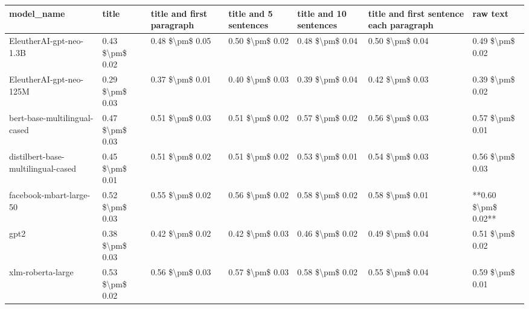 \begin{tabular}{lllllll}
\toprule
                        model\_name &           title & title and first paragraph & title and 5 sentences & title and 10 sentences & title and first sentence each paragraph &            raw text \\
\midrule
           EleutherAI-gpt-neo-1.3B & 0.43 \$\textbackslash pm\$ 0.02 &           0.48 \$\textbackslash pm\$ 0.05 &       0.50 \$\textbackslash pm\$ 0.02 &        0.48 \$\textbackslash pm\$ 0.04 &                         0.50 \$\textbackslash pm\$ 0.04 &     0.49 \$\textbackslash pm\$ 0.02 \\
           EleutherAI-gpt-neo-125M & 0.29 \$\textbackslash pm\$ 0.03 &           0.37 \$\textbackslash pm\$ 0.01 &       0.40 \$\textbackslash pm\$ 0.03 &        0.39 \$\textbackslash pm\$ 0.04 &                         0.42 \$\textbackslash pm\$ 0.03 &     0.39 \$\textbackslash pm\$ 0.02 \\
      bert-base-multilingual-cased & 0.47 \$\textbackslash pm\$ 0.03 &           0.51 \$\textbackslash pm\$ 0.03 &       0.51 \$\textbackslash pm\$ 0.02 &        0.57 \$\textbackslash pm\$ 0.02 &                         0.56 \$\textbackslash pm\$ 0.03 &     0.57 \$\textbackslash pm\$ 0.01 \\
distilbert-base-multilingual-cased & 0.45 \$\textbackslash pm\$ 0.01 &           0.51 \$\textbackslash pm\$ 0.02 &       0.51 \$\textbackslash pm\$ 0.02 &        0.53 \$\textbackslash pm\$ 0.01 &                         0.54 \$\textbackslash pm\$ 0.03 &     0.56 \$\textbackslash pm\$ 0.03 \\
           facebook-mbart-large-50 & 0.52 \$\textbackslash pm\$ 0.03 &           0.55 \$\textbackslash pm\$ 0.02 &       0.56 \$\textbackslash pm\$ 0.02 &        0.58 \$\textbackslash pm\$ 0.02 &                         0.58 \$\textbackslash pm\$ 0.01 & **0.60 \$\textbackslash pm\$ 0.02** \\
                              gpt2 & 0.38 \$\textbackslash pm\$ 0.03 &           0.42 \$\textbackslash pm\$ 0.02 &       0.42 \$\textbackslash pm\$ 0.03 &        0.46 \$\textbackslash pm\$ 0.02 &                         0.49 \$\textbackslash pm\$ 0.04 &     0.51 \$\textbackslash pm\$ 0.02 \\
                 xlm-roberta-large & 0.53 \$\textbackslash pm\$ 0.02 &           0.56 \$\textbackslash pm\$ 0.03 &       0.57 \$\textbackslash pm\$ 0.03 &        0.58 \$\textbackslash pm\$ 0.02 &                         0.55 \$\textbackslash pm\$ 0.04 &     0.59 \$\textbackslash pm\$ 0.01 \\
\bottomrule
\end{tabular}
